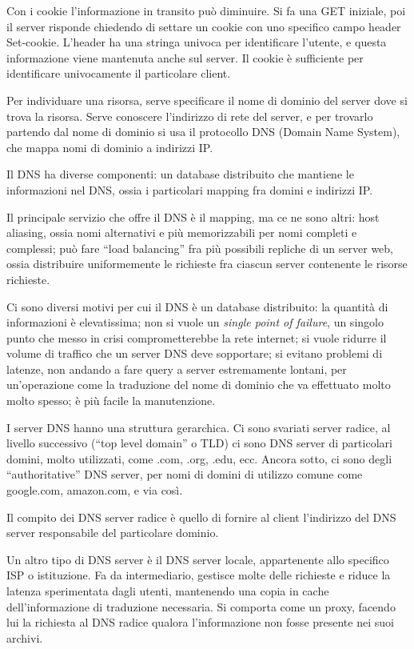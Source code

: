 Con i cookie l'informazione in transito pu\`o diminuire. Si fa una GET iniziale, poi il server risponde chiedendo di settare un cookie con uno specifico campo header Set-cookie. L'header ha una stringa univoca per identificare l'utente, e questa informazione viene mantenuta anche sul server. Il cookie \`e sufficiente per identificare univocamente il particolare client.

Per individuare una risorsa, serve specificare il nome di dominio del server dove si trova la risorsa. Serve conoscere l'indirizzo di rete del server, e per trovarlo partendo dal nome di dominio si usa il protocollo DNS (Domain Name System), che mappa nomi di dominio a indirizzi IP.

Il DNS ha diverse componenti: un database distribuito che mantiene le informazioni nel DNS, ossia i particolari mapping fra domini e indirizzi IP.

Il principale servizio che offre il DNS \`e il mapping, ma ce ne sono altri: host aliasing, ossia nomi alternativi e pi\`u memorizzabili per nomi completi e complessi; pu\`o fare ``load balancing'' fra pi\`u possibili repliche di un server web, ossia distribuire uniformemente le richieste fra ciascun server contenente le risorse richieste.

Ci sono diversi motivi per cui il DNS \`e un database distribuito: la quantit\`a di informazioni \`e elevatissima; non si vuole un \emph{single point of failure}, un singolo punto che messo in crisi comprometterebbe la rete internet; si vuole ridurre il volume di traffico che un server DNS deve sopportare; si evitano problemi di latenze, non andando a fare query a server estremamente lontani, per un'operazione come la traduzione del nome di dominio che va effettuato molto molto spesso; \`e pi\`u facile la manutenzione.

I server DNS hanno una struttura gerarchica. Ci sono svariati server radice, al livello successivo (``top level domain'' o TLD) ci sono DNS server di particolari domini, molto utilizzati, come .com, .org, .edu, ecc. Ancora sotto, ci sono degli ``authoritative'' DNS server, per nomi di domini di utilizzo comune come google.com, amazon.com, e via cos\`i.

Il compito dei DNS server radice \`e quello di fornire al client l'indirizzo del DNS server responsabile del particolare dominio.

Un altro tipo di DNS server \`e il DNS server locale, appartenente allo specifico ISP o istituzione. Fa da intermediario, gestisce molte delle richieste e riduce la latenza sperimentata dagli utenti, mantenendo una copia in cache dell'informazione di traduzione necessaria. Si comporta come un proxy, facendo lui la richiesta al DNS radice qualora l'informazione non fosse presente nei suoi archivi.


